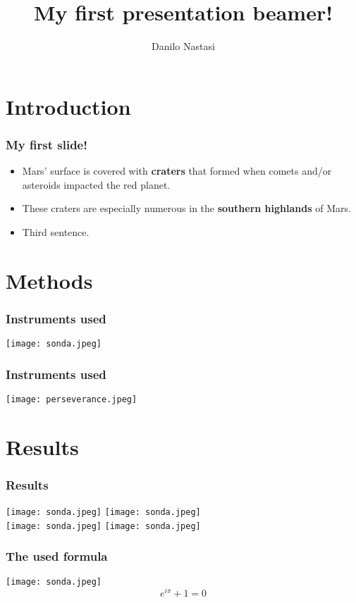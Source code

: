 \documentclass{beamer}
\title{My first presentation beamer!}
\author{Danilo Nastasi}
\begin{document}
\maketitle


\section{Introduction}
\begin{frame}
\frametitle{My first slide!}
\begin{itemize}
\item Mars' surface is covered with \textbf{craters} that formed when comets and/or asteroids impacted the red planet.
\item \pause These craters are especially numerous in the \textbf{southern highlands} of Mars.
\item \pause Third sentence.
\end{itemize}
\end{frame}



\section{Methods}
\begin{frame}
\frametitle{Instruments used}
\centering
\texttt{[image: sonda.jpeg]}
\end{frame}

\begin{frame}
\frametitle{Instruments used}
\centering
\texttt{[image: perseverance.jpeg]}
\end{frame}

\section{Results}
\begin{frame}
\frametitle{Results}
\centering
\texttt{[image: sonda.jpeg]}
\texttt{[image: sonda.jpeg]} \\
\texttt{[image: sonda.jpeg]}
\texttt{[image: sonda.jpeg]}
\end{frame}

\begin{frame}
\frametitle{The used formula}
\centering
\texttt{[image: sonda.jpeg]} \\
\begin{equation}
 e^{i \pi} + 1 = 0 
\end{equation}
\end{frame}
\end{document}
